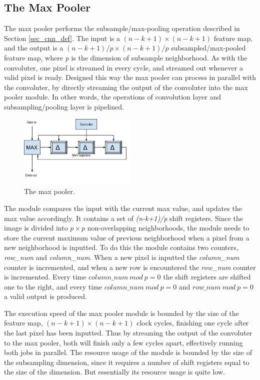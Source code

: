 \vspace*{1\baselineskip}
\subsection{The Max Pooler} \label{sec_max_pooler}

The max pooler performs the subsample/max-pooling operation described in Section \ref{sec_cnn_def}. The input is a $ (n-k+1) \times (n-k+1) $ feature map, and the output is a $ (n-k+1)/p \times (n-k+1)/p $ subsampled/max-pooled feature map, where \textit{p} is the dimension of subsample neighborhood. As with the convoluter, one pixel is streamed in every cycle, and streamed out whenever a valid pixel is ready. Designed this way the max pooler can process in parallel with the convoluter, by directly streaming the output of the convoluter into the max pooler module. In other words, the operations of convolution layer and subsampling/pooling layer is pipelined.

\begin{figure}[h!]
  \centering
      \includegraphics[width=0.5\textwidth]{Figures/Method/submax}
  \caption{The max pooler.}
\end{figure}

The module compares the input with the current max value, and updates the max value accordingly. It contains a set of \textit{(n-k+1)/p} shift registers. Since the image is divided into $ p \times p $ non-overlapping neighborhoods, the module needs to store the current maximum value of previous neighborhood when a pixel from a new neighborhood is inputted. To do this the module contains two counters, \textit{row\_num} and \textit{column\_num}. When a new pixel is inputted the \textit{column\_num} counter is incremented, and when a new row is encountered the \textit{row\_num} counter is incremented. Every time $ column\_num~mod~p = 0 $ the shift registers are shifted one to the right, and every time $ column\_num~mod~p = 0 $ and $ row\_num~mod~p = 0 $ a valid output is produced. 



The execution speed of the max pooler module is bounded by the size of the feature map, $ (n-k+1) \times (n-k+1) $ clock cycles, finishing one cycle after the last pixel has been inputted. 
Thus by streaming the output of the convoluter to the max pooler, both will finish only a few cycles apart, effectively running both jobs in parallel. The resource usage of the module is bounded by the size of the subsampling dimension, since it requires a number of shift registers equal to the size of the dimension. But essentially its resource usage is quite low.  
